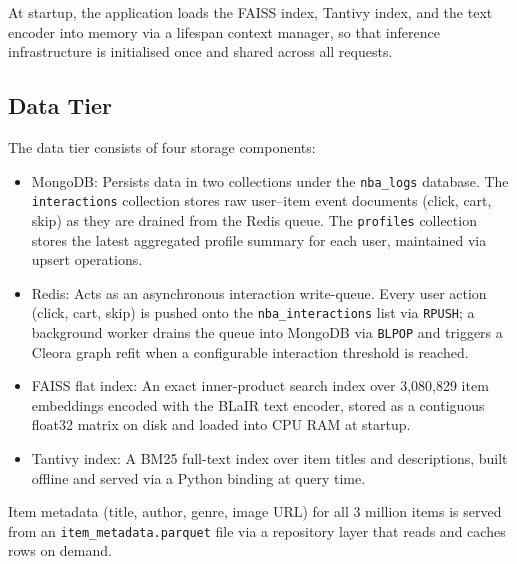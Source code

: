 At startup, the application loads the FAISS index, Tantivy index, and the text encoder into memory via a lifespan context manager, so that inference infrastructure is initialised once and shared across all requests.

\subsection{Data Tier}

The data tier consists of four storage components:

\begin{itemize}
    \item MongoDB: Persists data in two collections under the \texttt{nba\_logs} database. The \texttt{interactions} collection stores raw user–item event documents (click, cart, skip) as they are drained from the Redis queue. The \texttt{profiles} collection stores the latest aggregated profile summary for each user, maintained via upsert operations.
    \item Redis: Acts as an asynchronous interaction write-queue. Every user action (click, cart, skip) is pushed onto the \texttt{nba\_interactions} list via \texttt{RPUSH}; a background worker drains the queue into MongoDB via \texttt{BLPOP} and triggers a Cleora graph refit when a configurable interaction threshold is reached.
    \item FAISS flat index: An exact inner-product search index over 3{,}080{,}829 item embeddings encoded with the BLaIR text encoder, stored as a contiguous float32 matrix on disk and loaded into CPU RAM at startup.
    \item Tantivy index: A BM25 full-text index over item titles and descriptions, built offline and served via a Python binding at query time.
\end{itemize}

Item metadata (title, author, genre, image URL) for all 3 million items is served from an \texttt{item\_metadata.parquet} file via a repository layer that reads and caches rows on demand.

